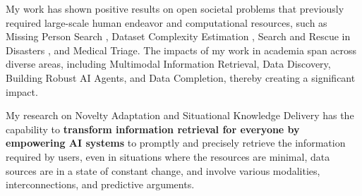


My work has shown positive results on open societal problems that previously required large-scale human endeavor and computational resources, such as Missing Person Search \cite{solaiman2021applying}, Dataset Complexity Estimation \cite{solaiman2023domainComplexity}, Search and Rescue in Disasters \cite{solaiman2013avra}, and Medical Triage. The impacts of my work in academia span across diverse areas, including Multimodal Information Retrieval, Data Discovery, Building Robust AI Agents, and Data Completion, thereby creating a significant impact.

My research on Novelty Adaptation and Situational Knowledge Delivery has the capability to \textbf{transform information retrieval for everyone by empowering AI systems }to promptly and precisely retrieve the information required by users, even in situations where the resources are minimal, data sources are in a state of constant change, and involve various modalities, interconnections, and predictive arguments.


